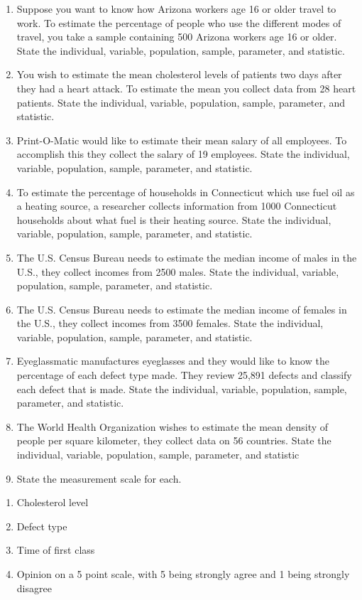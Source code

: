 \documentclass[]{book}
\begin{document}
\begin{enumerate}
\def\labelenumi{\arabic{enumi}.}
\item
  Suppose you want to know how Arizona workers age 16 or older travel to work. To estimate the percentage of people who use the different modes of travel, you take a sample containing 500 Arizona workers age 16 or older. State the individual, variable, population, sample, parameter, and statistic.
\item
  You wish to estimate the mean cholesterol levels of patients two days after they had a heart attack. To estimate the mean you collect data from 28 heart patients. State the individual, variable, population, sample, parameter, and statistic.
\item
  Print-O-Matic would like to estimate their mean salary of all employees. To accomplish this they collect the salary of 19 employees. State the individual, variable, population, sample, parameter, and statistic.
\item
  To estimate the percentage of households in Connecticut which use fuel oil as a heating source, a researcher collects information from 1000 Connecticut households about what fuel is their heating source. State the individual, variable, population, sample, parameter, and statistic.
\item
  The U.S. Census Bureau needs to estimate the median income of males in the U.S., they collect incomes from 2500 males. State the individual, variable, population, sample, parameter, and statistic.
\item
  The U.S. Census Bureau needs to estimate the median income of females in the U.S., they collect incomes from 3500 females. State the individual, variable, population, sample, parameter, and statistic.
\item
  Eyeglassmatic manufactures eyeglasses and they would like to know the percentage of each defect type made. They review 25,891 defects and classify each defect that is made. State the individual, variable, population, sample, parameter, and statistic.
\item
  The World Health Organization wishes to estimate the mean density of people per square kilometer, they collect data on 56 countries. State the individual, variable, population, sample, parameter, and statistic
\item
  State the measurement scale for each.
\end{enumerate}

\begin{enumerate}
\def\labelenumi{\alph{enumi}.}
\item
  Cholesterol level
\item
  Defect type
\item
  Time of first class
\item
  Opinion on a 5 point scale, with 5 being strongly agree and 1 being
  strongly disagree
\end{enumerate}
\end{document}
